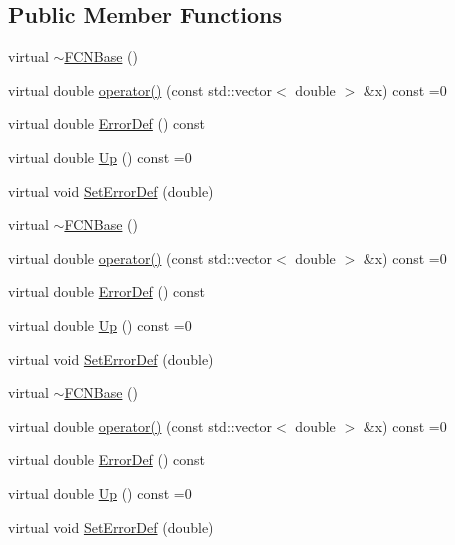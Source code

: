 \subsection*{Public Member Functions}
\begin{DoxyCompactItemize}
\item 
virtual \mbox{\hyperlink{classROOT_1_1Minuit2_1_1FCNBase_a2b80638970a23652d21c5f840c3979fa}{$\sim$\+F\+C\+N\+Base}} ()
\item 
virtual double \mbox{\hyperlink{classROOT_1_1Minuit2_1_1FCNBase_ae4a86bd94d0d0f5ca6fc8f8ab2bb43cd}{operator()}} (const std\+::vector$<$ double $>$ \&x) const =0
\item 
virtual double \mbox{\hyperlink{classROOT_1_1Minuit2_1_1FCNBase_ac4592475c58a65b037ba97ab5f3cba10}{Error\+Def}} () const
\item 
virtual double \mbox{\hyperlink{classROOT_1_1Minuit2_1_1FCNBase_a04ef08ddad92ce8d89d498efbe021c39}{Up}} () const =0
\item 
virtual void \mbox{\hyperlink{classROOT_1_1Minuit2_1_1FCNBase_a840e02c2e6ef96eec289deca096b6088}{Set\+Error\+Def}} (double)
\item 
virtual \mbox{\hyperlink{classROOT_1_1Minuit2_1_1FCNBase_a2b80638970a23652d21c5f840c3979fa}{$\sim$\+F\+C\+N\+Base}} ()
\item 
virtual double \mbox{\hyperlink{classROOT_1_1Minuit2_1_1FCNBase_ae4a86bd94d0d0f5ca6fc8f8ab2bb43cd}{operator()}} (const std\+::vector$<$ double $>$ \&x) const =0
\item 
virtual double \mbox{\hyperlink{classROOT_1_1Minuit2_1_1FCNBase_ac4592475c58a65b037ba97ab5f3cba10}{Error\+Def}} () const
\item 
virtual double \mbox{\hyperlink{classROOT_1_1Minuit2_1_1FCNBase_a04ef08ddad92ce8d89d498efbe021c39}{Up}} () const =0
\item 
virtual void \mbox{\hyperlink{classROOT_1_1Minuit2_1_1FCNBase_a840e02c2e6ef96eec289deca096b6088}{Set\+Error\+Def}} (double)
\item 
virtual \mbox{\hyperlink{classROOT_1_1Minuit2_1_1FCNBase_a2b80638970a23652d21c5f840c3979fa}{$\sim$\+F\+C\+N\+Base}} ()
\item 
virtual double \mbox{\hyperlink{classROOT_1_1Minuit2_1_1FCNBase_ae4a86bd94d0d0f5ca6fc8f8ab2bb43cd}{operator()}} (const std\+::vector$<$ double $>$ \&x) const =0
\item 
virtual double \mbox{\hyperlink{classROOT_1_1Minuit2_1_1FCNBase_ac4592475c58a65b037ba97ab5f3cba10}{Error\+Def}} () const
\item 
virtual double \mbox{\hyperlink{classROOT_1_1Minuit2_1_1FCNBase_a04ef08ddad92ce8d89d498efbe021c39}{Up}} () const =0
\item 
virtual void \mbox{\hyperlink{classROOT_1_1Minuit2_1_1FCNBase_a840e02c2e6ef96eec289deca096b6088}{Set\+Error\+Def}} (double)
\end{DoxyCompactItemize}


